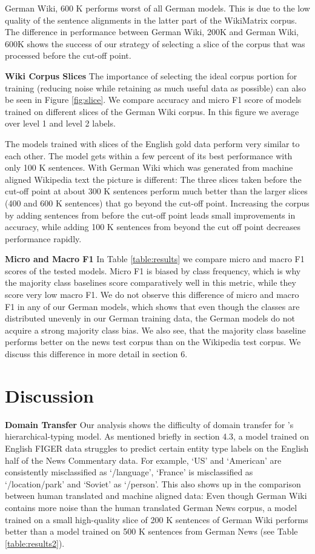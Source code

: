 \documentclass[11pt,a4paper]{article}
\begin{document}
German Wiki, 600 K performs worst of all German models. This is due to the low quality of the sentence alignments in the latter part of the WikiMatrix corpus. The difference in performance between German Wiki, 200K and German Wiki, 600K shows the success of our strategy of selecting a slice of the corpus that was processed before the cut-off point. 

\textbf{Wiki Corpus Slices} The importance of selecting the ideal corpus portion for training (reducing noise while retaining as much useful data as possible) can also be seen in Figure \ref{fig:slice}. We compare accuracy and micro F1 score of models trained on different slices of the German Wiki corpus. In this figure we average over level 1 and level 2 labels. 

The models trained with slices of the English gold data perform very similar to each other. The model gets within a few percent of its best performance with only 100 K sentences. With German Wiki which was generated from machine aligned Wikipedia text the picture is different: The three slices taken before the cut-off point at about 300 K sentences perform much better than the larger slices (400 and 600 K sentences) that go beyond the cut-off point. Increasing the corpus by adding sentences from before the cut-off point leads small improvements in accuracy, while adding 100 K sentences from beyond the cut off point decreases performance rapidly.   

\textbf{Micro and Macro F1} In Table \ref{table:results} we compare micro and macro F1 scores of the tested models. Micro F1 is biased by class frequency, which is why the majority class baselines score comparatively well in this metric, while they score very low macro F1. We do not observe this difference of micro and macro F1 in any of our German models, which shows that even though the classes are distributed unevenly in our German training data, the German models do not acquire a strong majority class bias. We also see, that the majority class baseline performs better on the news test corpus than on the Wikipedia test corpus. We discuss this difference in more detail in section 6.

\section{Discussion}
\textbf{Domain Transfer} Our analysis shows the difficulty of domain transfer for \citet{ChenCD20}'s hierarchical-typing model. As mentioned briefly in  section 4.3, a model trained on English FIGER data struggles to predict certain entity type labels on the English half of the News Commentary data. For example, `US' and `American' are consistently misclassified as `/language', `France' is misclassified as `/location/park' and `Soviet' as `/person'. 
This also shows up in the comparison between human translated and machine aligned data: Even though German Wiki contains more noise than the human translated German News corpus, a model trained on a small high-quality slice of 200 K sentences of German Wiki performs better than a model trained on 500 K sentences from German News (see Table \ref{table:results2}).
\end{document}
